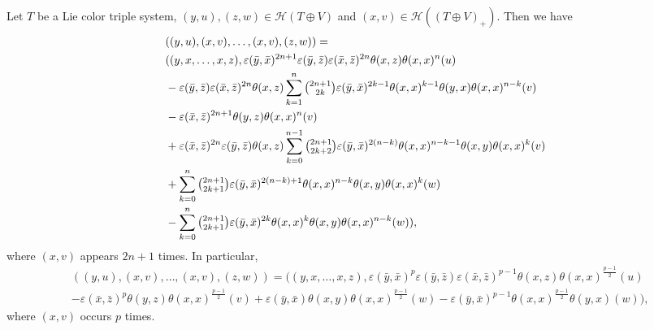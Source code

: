 \documentclass[11pt, twoside]{article}
\begin{document}
\begin{prop}\label{p5.17}
    Let $T$ be a Lie color triple system, $(y,u),(z,w)\in \mathcal{H}(T\oplus V)$ and $(x,v)\in \mathcal{H}((T\oplus V)_+)$. Then we have 
    \begin{align*}
       & ((y,u),(x,v),\dots,(x,v),(z,w))= 
       \\ &((y,x,\dots,x,z), \varepsilon(\bar{y},\bar{x})^{2n+1}\varepsilon(\bar{y},\bar{z})\varepsilon(\bar{x},\bar{z})^{2n}\theta(x,z)\theta(x,x)^n(u)\\ & - \varepsilon(\bar{y},\bar{z})\varepsilon(\bar{x},\bar{z})^{2n}\theta(x,z)\sum\limits_{k=1}^n\tbinom{2n+1}{2k}\varepsilon(\bar{y},\bar{x})^{2k-1}\theta(x,x)^{k-1}\theta(y,x)\theta(x,x)^{n-k}(v)\\ & - \varepsilon(\bar{x},\bar{z})^{2n+1}\theta(y,z)\theta(x,x)^n(v) \\ &+ \varepsilon(\bar{x},\bar{z})^{2n}\varepsilon(\bar{y},\bar{z})\theta(x,z)\sum\limits_{k=0}^{n-1}\tbinom{2n+1}{2k+2}\varepsilon(\bar{y},\bar{x})^{2(n-k)}\theta(x,x)^{n-k-1}\theta(x,y)\theta(x,x)^k(v)\\ & +\sum\limits_{k=0}^n \tbinom{2n+1}{2k+1}\varepsilon(\bar{y},\bar{x})^{2(n-k)+1}\theta(x,x)^{n-k}\theta(x,y)\theta(x,x)^k(w)\\ &-\sum\limits_{k=0}^n \tbinom{2n+1}{2k+1}\varepsilon(\bar{y},\bar{x})^{2k}\theta(x,x)^{k}\theta(x,y)\theta(x,x)^{n-k}(w) ) ,
    \end{align*} where $(x,v)$ appears $2n+1$ times. In particular, \begin{align*}
        &((y,u),(x,v),\dots,(x,v),(z,w)) = ((y,x,\dots,x,z), \varepsilon(\bar{y},\bar{x})^p\varepsilon(\bar{y},\bar{z})\varepsilon(\bar{x},\bar{z})^{p-1}\theta(x,z)\theta(x,x)^{\frac{p-1}{2}}(u)\\ & - \varepsilon(\bar{x},\bar{z})^p\theta(y,z)\theta(x,x)^{\frac{p-1}{2}}(v) + \varepsilon(\bar{y},\bar{x})\theta(x,y)\theta(x,x)^{\frac{p-1}{2}}(w) - \varepsilon(\bar{y},\bar{x})^{p-1}\theta(x,x)^{\frac{p-1}{2}}\theta(y,x)(w))  ,
    \end{align*} where $(x,v)$ occurs $p$ times.
\end{prop}
\end{document}
